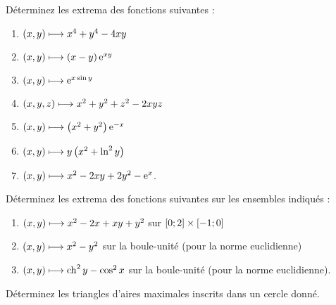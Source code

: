 \begin{exoss}
Déterminez les extrema des fonctions suivantes :

\begin{enumerate}
    \item \(\left(x,y\right)\longmapsto x^4+y^4-4xy\) \\
    \item \(\left(x,y\right)\longmapsto\left(x-y\right)\mathrm{e}^{xy}\) \\
    \item \(\left(x,y\right)\longmapsto\mathrm{e}^{x\sin y}\) \\
    \item \(\left(x,y,z\right)\longmapsto x^2+y^2+z^2-2xyz\) \\
    \item \(\left(x,y\right)\longmapsto\left(x^2+y^2\right)\mathrm{e}^{-x}\) \\
    \item \(\left(x,y\right)\longmapsto y\left(x^2+\ln^2y\right)\) \\
    \item \(\left(x,y\right)\longmapsto x^2-2xy+2y^2-\mathrm{e}^{x}\).
\end{enumerate}
\end{exoss}

\begin{exoss}
Déterminez les extrema des fonctions suivantes sur les ensembles indiqués :

\begin{enumerate}
    \item \(\left(x,y\right)\longmapsto x^2-2x+xy+y^2\) sur \(\left[0;2\right]\times\left[-1;0\right]\) \\
    \item \(\left(x,y\right)\longmapsto x^2-y^2\) sur la boule-unité (pour la norme euclidienne) \\
    \item \(\left(x,y\right)\longmapsto\operatorname{ch}^2y-\cos^2x\) sur la boule-unité (pour la norme euclidienne).
\end{enumerate}
\end{exoss}

\begin{exoss}
Déterminez les triangles d'aires maximales inscrits dans un cercle donné.
\end{exoss}

